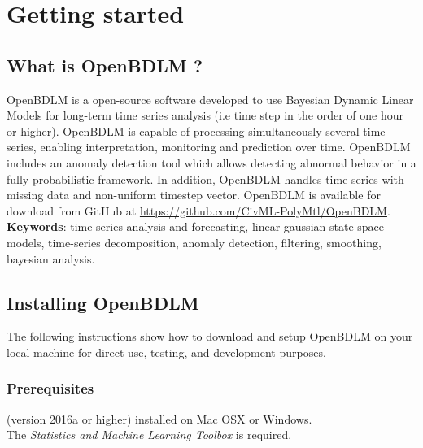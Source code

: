 \section{Getting started}

\subsection{What is OpenBDLM ?}
\label{S:OPENBDLMWHATIS}

OpenBDLM is a \MATLAB{} open-source software developed to use Bayesian Dynamic Linear Models for long-term time series analysis (i.e time step in the order of one hour or higher).
OpenBDLM is capable of processing simultaneously several time series, enabling interpretation, monitoring and prediction over time.
OpenBDLM includes an anomaly detection tool which allows detecting abnormal behavior in a fully probabilistic framework.
In addition, OpenBDLM handles time series with missing data and non-uniform timestep vector.
OpenBDLM is available for download from GitHub at \url{https://github.com/CivML-PolyMtl/OpenBDLM}.\\

\noindent \textbf{Keywords}: time series analysis and forecasting, linear gaussian state-space models, time-series decomposition, anomaly detection, filtering, smoothing, bayesian analysis.

\subsection{Installing OpenBDLM}
\label{S:OPENBDLMINSTALLING}

The following instructions show how to download and setup OpenBDLM on your local machine for direct use, testing, and development purposes.
\subsubsection{Prerequisites}
\MATLAB{} (version 2016a or higher) installed on Mac OSX or Windows.\\

\noindent
The \MATLAB{}  \emph{Statistics and Machine Learning Toolbox} is required.


